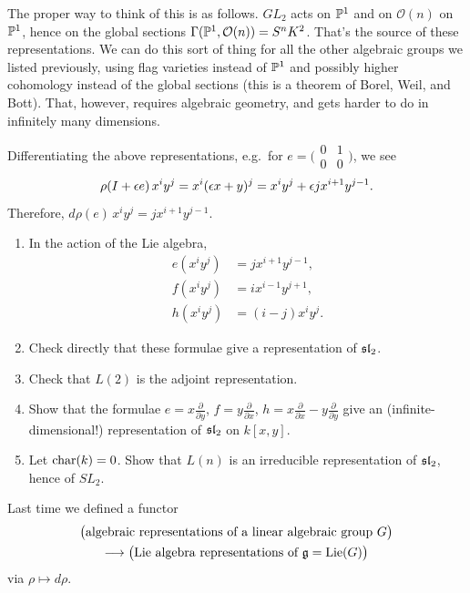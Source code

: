 \begin{remark}
The proper way to think of this is as follows. $GL_2$ acts on $\PP^1$ and on
$\mathcal{O}(n)$ on $\PP^1$, hence on the global sections
$\Gamma(\PP^1, \mathcal{O}(n)) = S^nK^2$. That's the source of these
representations. We can do this sort of thing for all the other algebraic
groups we listed previously, using flag varieties instead of $\PP^1$ and
possibly higher cohomology instead of the global sections (this is a theorem
of Borel, Weil, and Bott). That, however, requires algebraic geometry, and gets
harder to do in infinitely many dimensions.
\end{remark}

Differentiating the above representations, e.g.\ for
$e = \bigl(\begin{smallmatrix} 0 & 1 \\ 0 & 0 \end{smallmatrix}\bigr)$, we see
\[
  \rho(I + \eps e)\, x^iy^j = x^i(\eps x + y)^j = x^iy^j + \eps j x^{i+1}y^{j-1}.
\]
Therefore, $d\rho(e)\, x^iy^j = j x^{i+1}y^{j-1}$.

\begin{exercise}\leavevmode
\begin{enumerate}
  \item In the action of the Lie algebra,
    \begin{align*}
      e(x^iy^j) &= j x^{i+1}y^{j-1},\\
      f(x^iy^j) &= i x^{i-1}y^{j+1},\\
      h(x^iy^j) &= (i - j) x^iy^j.
    \end{align*}
  \item Check directly that these formulae give a representation of $\sl_2$.
  \item Check that $L(2)$ is the adjoint representation.
  \item Show that the formulae $e = x\frac{\partial}{\partial y}$,
    $f = y\frac{\partial}{\partial x}$,
    $h = x\frac{\partial}{\partial x} - y\frac{\partial}{\partial y}$ give an
    (infinite-dimensional!) representation of $\sl_2$ on $k[x, y]$.
  \item Let $\charac(k) = 0$. Show that $L(n)$ is an irreducible representation
    of $\sl_2$, hence of $SL_2$.
\end{enumerate}
\end{exercise}

 Last time we defined a functor
\begin{multline*}
  \bigl(\text{algebraic representations of a linear algebraic group } G\bigr)\\
  \longrightarrow
  \bigl(\text{Lie algebra representations of } \g = \Lie(G)\bigr)
\end{multline*}
via $\rho \mapsto d\rho$.


